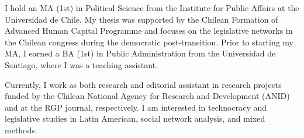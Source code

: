 




\par{I hold an MA (1st) in Political Science from the Institute for Public Affairs at the Universidad de Chile. My thesis was supported by the Chilean Formation of Advanced Human Capital Programme and focuses on the legislative networks in the Chilean congress during the democratic post-transition. Prior to starting my MA, I earned a BA (1st) in Public Administration from the Universidad de Santiago, where I was a teaching assistant.

Currently, I work as both research and editorial assistant in research projects funded by the Chilean National Agency for Research and Development (ANID) and at the RGP journal, respectively. I am interested in technocracy and legislative studies in Latin American, social network analysis, and mixed methods.}\\